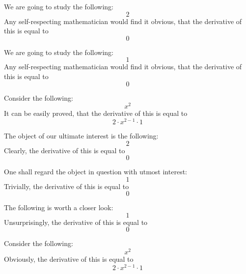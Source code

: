 \documentclass{article}
\begin{document}
We are going to study the following:
\begin{equation}
2 
\end{equation}
Any self-respecting mathematician would find it obvious, that the derivative of this is equal to
\begin{equation}
0 
\end{equation}

We are going to study the following:
\begin{equation}
1 
\end{equation}
Any self-respecting mathematician would find it obvious, that the derivative of this is equal to
\begin{equation}
0 
\end{equation}

Consider the following:
\begin{equation}
x ^{2 } 
\end{equation}
It can be easily proved, that the derivative of this is equal to
\begin{equation}
2 \cdot x ^{2 - 1 } \cdot 1 
\end{equation}

The object of our ultimate interest is the following:
\begin{equation}
2 
\end{equation}
Clearly, the derivative of this is equal to
\begin{equation}
0 
\end{equation}

One shall regard the object in question with utmost interest:
\begin{equation}
1 
\end{equation}
Trivially, the derivative of this is equal to
\begin{equation}
0 
\end{equation}

The following is worth a closer look:
\begin{equation}
1 
\end{equation}
Unsurprisingly, the derivative of this is equal to
\begin{equation}
0 
\end{equation}

Consider the following:
\begin{equation}
x ^{2 } 
\end{equation}
Obviously, the derivative of this is equal to
\begin{equation}
2 \cdot x ^{2 - 1 } \cdot 1 
\end{equation}
\end{document}

